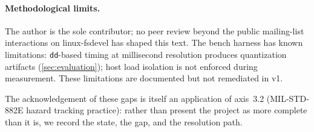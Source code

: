 \paragraph{Methodological limits.}
The author is the sole contributor; no peer review beyond the
public mailing-list interactions on linux-fsdevel has shaped this
text. The bench harness has known limitations: \texttt{dd}-based
timing at millisecond resolution produces quantization artifacts
(\cref{sec:evaluation}); host load isolation is not enforced
during measurement. These limitations are documented but not
remediated in v1.

The acknowledgement of these gaps is itself an application of
axis~3.2 (MIL-STD-882E hazard tracking practice): rather than
present the project as more complete than it is, we record the
state, the gap, and the resolution path.
